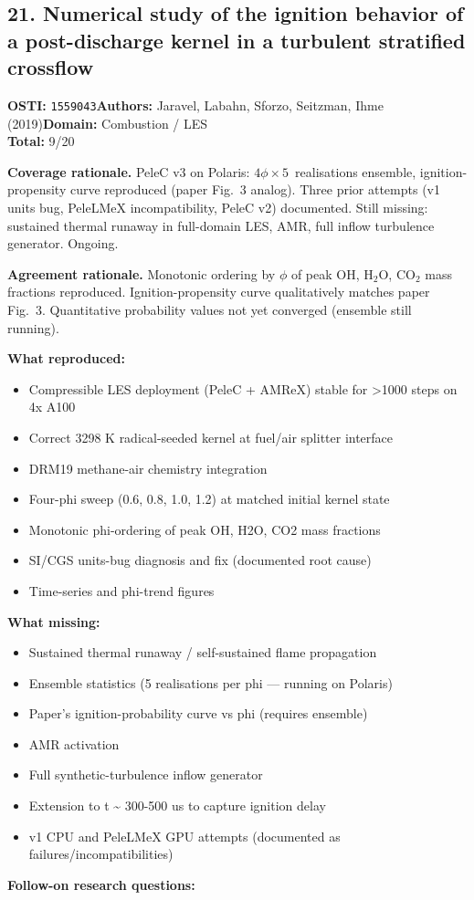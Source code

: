\subsection{21. Numerical study of the ignition behavior of a post-discharge kernel in a turbulent stratified crossflow}
\textbf{OSTI:} \texttt{1559043}\quad\textbf{Authors:} Jaravel, Labahn, Sforzo, Seitzman, Ihme (2019)\quad\textbf{Domain:} Combustion / LES\\
\quad{}\quad\textbf{Total:} 9/20\par\smallskip
\noindent\textbf{Coverage rationale.} PeleC v3 on Polaris: $4\phi \times 5$~realisations ensemble, ignition-propensity curve reproduced (paper Fig.~3 analog). Three prior attempts (v1 units bug, PeleLMeX incompatibility, PeleC v2) documented. Still missing: sustained thermal runaway in full-domain LES, AMR, full inflow turbulence generator. Ongoing.\par
\noindent\textbf{Agreement rationale.} Monotonic ordering by $\phi$ of peak OH, H$_2$O, CO$_2$ mass fractions reproduced. Ignition-propensity curve qualitatively matches paper Fig.~3. Quantitative probability values not yet converged (ensemble still running).\par\smallskip
\noindent\textbf{What reproduced:}
\begin{itemize}[leftmargin=1.4em,itemsep=0.2em,topsep=0.2em]
\item Compressible LES deployment (PeleC + AMReX) stable for \textgreater{}1000 steps on 4x A100
\item Correct 3298 K radical-seeded kernel at fuel/air splitter interface
\item DRM19 methane-air chemistry integration
\item Four-phi sweep (0.6, 0.8, 1.0, 1.2) at matched initial kernel state
\item Monotonic phi-ordering of peak OH, H2O, CO2 mass fractions
\item SI/CGS units-bug diagnosis and fix (documented root cause)
\item Time-series and phi-trend figures
\end{itemize}\noindent\textbf{What missing:}
\begin{itemize}[leftmargin=1.4em,itemsep=0.2em,topsep=0.2em]
\item Sustained thermal runaway / self-sustained flame propagation
\item Ensemble statistics (5 realisations per phi --- running on Polaris)
\item Paper's ignition-probability curve vs phi (requires ensemble)
\item AMR activation
\item Full synthetic-turbulence inflow generator
\item Extension to t \textasciitilde{} 300-500 us to capture ignition delay
\item v1 CPU and PeleLMeX GPU attempts (documented as failures/incompatibilities)
\end{itemize}\noindent\textbf{Follow-on research questions:}

